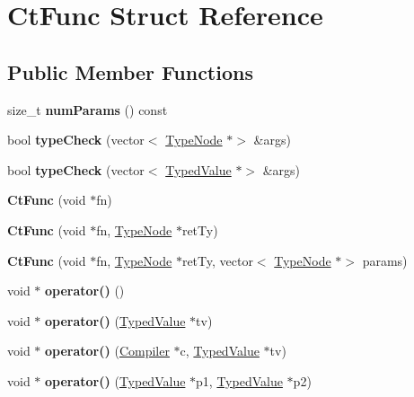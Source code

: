 \hypertarget{structCtFunc}{}\section{Ct\+Func Struct Reference}
\label{structCtFunc}
\subsection*{Public Member Functions}
\begin{DoxyCompactItemize}
\item 
\mbox{\label{structCtFunc_adc832306efa0d9948782d5a145ee3a83}} 
size\+\_\+t {\bfseries num\+Params} () const
\item 
\mbox{\label{structCtFunc_aecc58cf9fc988818ede06481f94bf832}} 
bool {\bfseries type\+Check} (vector$<$ \hyperlink{structTypeNode}{Type\+Node} $\ast$$>$ \&args)
\item 
\mbox{\label{structCtFunc_a06c35a2062e99e85c42c8a2485abd0e4}} 
bool {\bfseries type\+Check} (vector$<$ \hyperlink{structTypedValue}{Typed\+Value} $\ast$$>$ \&args)
\item 
\mbox{\label{structCtFunc_a771f13cc6151a52c018d51d97ec49139}} 
{\bfseries Ct\+Func} (void $\ast$fn)
\item 
\mbox{\label{structCtFunc_ad10a90f1961fe74380cca386bd3f9d8d}} 
{\bfseries Ct\+Func} (void $\ast$fn, \hyperlink{structTypeNode}{Type\+Node} $\ast$ret\+Ty)
\item 
\mbox{\label{structCtFunc_aeb16ffd12499153ba9a1d73ff2f9a2c1}} 
{\bfseries Ct\+Func} (void $\ast$fn, \hyperlink{structTypeNode}{Type\+Node} $\ast$ret\+Ty, vector$<$ \hyperlink{structTypeNode}{Type\+Node} $\ast$$>$ params)
\item 
\mbox{\label{structCtFunc_aeb2934dc006883fe639b49c89eaf840b}} 
void $\ast$ {\bfseries operator()} ()
\item 
\mbox{\label{structCtFunc_aa07d0cf890b77c688ea7d7c91a80e3e0}} 
void $\ast$ {\bfseries operator()} (\hyperlink{structTypedValue}{Typed\+Value} $\ast$tv)
\item 
\mbox{\label{structCtFunc_a6c700b6a12c8de8dbc85f3ddfab867d8}} 
void $\ast$ {\bfseries operator()} (\hyperlink{structante_1_1Compiler}{Compiler} $\ast$c, \hyperlink{structTypedValue}{Typed\+Value} $\ast$tv)
\item 
\mbox{\label{structCtFunc_abbc60b6c06b4e08e1a8c29b28c05adf3}} 
void $\ast$ {\bfseries operator()} (\hyperlink{structTypedValue}{Typed\+Value} $\ast$p1, \hyperlink{structTypedValue}{Typed\+Value} $\ast$p2)
\end{DoxyCompactItemize}
